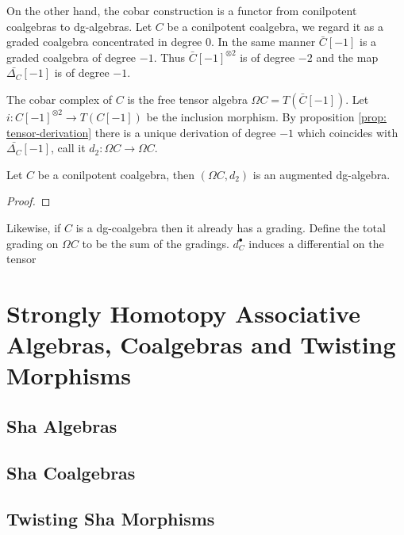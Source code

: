 \documentclass[../thesis.tex]{subfiles}
\begin{document}
            On the other hand, the cobar construction is a functor from conilpotent coalgebras to dg-algebras. Let $C$ be a conilpotent coalgebra, we regard it as a graded coalgebra concentrated in degree $0$. In the same manner $\bar{C}[-1]$ is a graded coalgebra of degree $-1$. Thus $\bar{C}[-1]^{\otimes 2}$ is of degree $-2$ and the map $\bar{\Delta_C}[-1]$ is of degree $-1$. 

            The cobar complex of $C$ is the free tensor algebra $\Omega C = T(\bar{C}[-1])$. Let $i:C[-1]^{\otimes 2}\rightarrow T(C[-1])$ be the inclusion morphism. By proposition \ref{prop: tensor-derivation} there is a unique derivation of degree $-1$ which coincides with $\bar{\Delta_C}[-1]$, call it $d_2: \Omega C\rightarrow \Omega C$.

            \begin{proposition}
                Let $C$ be a conilpotent coalgebra, then $(\Omega C, d_2)$ is an augmented dg-algebra.
            \end{proposition}

            \begin{proof}
                
            \end{proof}

            Likewise, if $C$ is a dg-coalgebra then it already has a grading. Define the total grading on $\Omega C$ to be the sum of the gradings. $d_C^\bullet$ induces a differential on the tensor

    \section{Strongly Homotopy Associative Algebras, Coalgebras and Twisting Morphisms}

        \subsection{Sha Algebras}

        \subsection{Sha Coalgebras}

        \subsection{Twisting Sha Morphisms}
\end{document}
